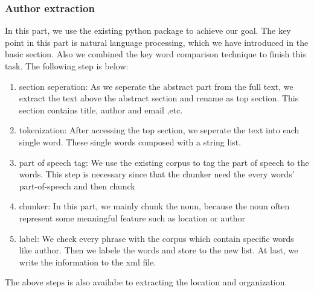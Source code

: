 \subsubsection*{Author extraction}
In this part, we use the existing python package to achieve our goal. 
The key point in this part is natural language processing, which we have introduced in the basic section. 
Also we combined the key word comparison technique to finish this task. The following step is below:

\begin{enumerate}
	\item section seperation: As we seperate the abstract part from the full text, we extract the text above the abstract section and rename as top section. This section contains title, author and email ,etc.
	\item tokenization: After accessing the top section, we seperate the text into each single word. These single words composed with a string list. 
	\item part of speech tag: We use the existing corpus to tag the part of speech to the words. This step is necessary since that the chunker need the every words' part-of-speech and then chunck
	\item chunker: In this part, we mainly chunk the noun, because the noun often represent some meaningful feature such as location or author
	\item label: We check every phrase with the corpus which contain specific words like author. Then we labele the words and store to the new list. At last, we write the information to the xml file. 
\end{enumerate}

The above steps is also availabe to extracting the location and organization.
